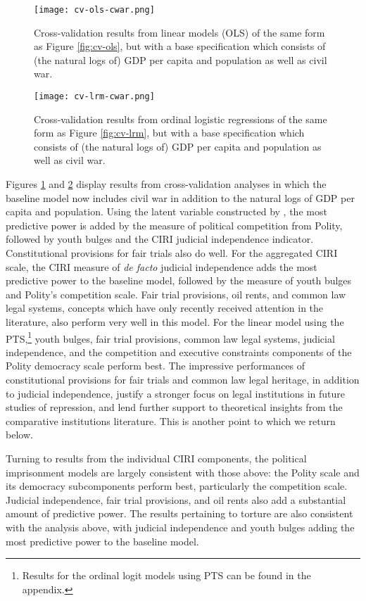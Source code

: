 \documentclass[11pt]{article}
\begin{document}
\begin{figure}[!htpb]
\centering
\texttt{[image: cv-ols-cwar.png]}
\caption{Cross-validation results from linear models (OLS) of the same form as Figure \ref{fig:cv-ols}, but with a base specification which consists of (the natural logs of) GDP per capita and population as well as civil war.}
\label{fig:cv-ols-cwar}
\end{figure}

\begin{figure}[!htpb]
\centering
\texttt{[image: cv-lrm-cwar.png]}
\caption{Cross-validation results from ordinal logistic regressions of the same form as Figure \ref{fig:cv-lrm}, but with a base specification which consists of (the natural logs of) GDP per capita and population as well as civil war.}
\label{fig:cv-lrm-cwar}
\end{figure}

Figures \ref{fig:cv-ols-cwar} and \ref{fig:cv-lrm-cwar} display results from cross-validation analyses in which the baseline model now includes civil war in addition to the natural logs of GDP per 
capita and population. Using the latent variable constructed by \citet{Fariss2013}, the most predictive power is added by the measure of political competition from Polity, followed by youth bulges and the CIRI judicial independence indicator. Constitutional provisions for fair trials also do well. For the aggregated CIRI scale, the CIRI measure of {\it de facto} judicial independence adds the most predictive power to the baseline model, followed by the measure of youth bulges and Polity's competition scale. Fair trial provisions, oil rents, and common law legal systems, concepts which have only recently received attention in the literature, also perform very well in this model. For the linear model using the PTS,\footnote{Results for the ordinal logit models using PTS can be found in the appendix.} youth bulges, fair trial provisions, common law legal systems, judicial independence, and the competition and executive constraints components of the Polity democracy scale perform best. The impressive performances of constitutional provisions for fair trials and common law legal heritage, in addition to judicial independence, justify a stronger focus on legal institutions in future studies of repression, and lend further support to theoretical insights from the comparative institutions literature. This is another point to which we return below.

Turning to results from the individual CIRI components, the political imprisonment models are largely consistent with those above: the Polity scale and its democracy subcomponents perform best, particularly the competition scale. Judicial independence, fair trial provisions, and oil rents also add a substantial amount of predictive power. The results pertaining to torture are also consistent with the analysis above, with judicial independence and youth bulges adding the most predictive power to the baseline model. 
\end{document}
